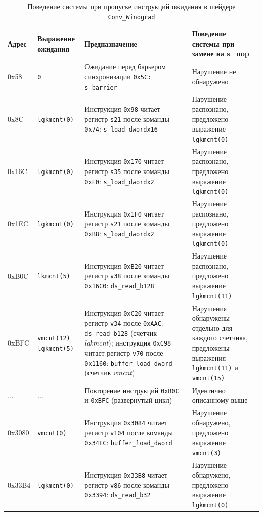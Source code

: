 \documentclass[a4paper,14pt]{extarticle}
\begin{document}
{\begin{table}[H]
  \caption{Поведение системы при пропуске инструкций ожидания в шейдере \texttt{Conv\_Winograd}}
\label{table:test-waitcnt-winograd}
\begin{tabular}{|l|p{2.8cm}|p{6.5cm}|p{5cm}|}
\hline
\textbf{Адрес} & \textbf{Выражение ожидания} & \textbf{Предназначение} & \textbf{Поведение системы при замене на s\_nop} \\\hline
0x58 & \verb|0|
  & Ожидание перед барьером синхронизации \texttt{0x5C: s\_barrier}
  & Нарушение не обнаружено \\\hline
0x8C & \verb|lgkmcnt(0)|
  & Инструкция \verb|0x98| читает регистр \verb|s21| после команды \verb|0x74|: \verb|s_load_dwordx16|
  & Нарушение распознано, предложено выражение \verb|lgkmcnt(0)| \\\hline
0x16C & \verb|lgkmcnt(0)|
  & Инструкция \verb|0x170| читает регистр \verb|s35| после команды \verb|0xE0|: \verb|s_load_dwordx2|
  & Нарушение распознано, предложено выражение \verb|lgkmcnt(0)| \\\hline
0x1EC & \verb|lgkmcnt(0)|
  & Инструкция \verb|0x1F0| читает регистр \verb|s21| после команды \verb|0xB8|: \verb|s_load_dwordx2|
  & Нарушение распознано, предложено выражение \verb|lgkmcnt(0)| \\\hline
0xB0C & \verb|lkmcnt(5)|
  & Инструкция \verb|0xB20| читает регистр \verb|v38| после команды \verb|0x16C0|: \verb|ds_read_b128|
  & Нарушение распознано, предложено выражение \verb|lgkmcnt(11)| \\\hline
0xBFC & \verb|vmcnt(12)| \verb|lgkmcnt(5)|
  & Инструкция \verb|0xC20| читает регистр \verb|v34| после \verb|0xAAC|: \verb|ds_read_b128| (счетчик \textit{lgkmcnt});
  инструкция \verb|0xC98| читает регистр \verb|v70| после \verb|0x1160|: \verb|buffer_load_dword| (счетчик \textit{vmcnt})
  & Нарушения обнаружены отдельно для каждого счетчика, предложены выражения \verb|lgkmcnt(11)| и \verb|vmcnt(15)| \\\hline 
... & ... & Повторение инструкций \texttt{0xB0C} и \texttt{0xBFC} (развернутый цикл) & Идентично описанному выше \\\hline
0x3080 & \verb|vmcnt(0)|
  & Инструкция \verb|0x3084| читает регистр \verb|v104| после команды \verb|0x34FC|: \verb|buffer_load_dword|
  & Нарушение обнаружено, предложено выражение \verb|vmcnt(3)| \\\hline
0x33B4 & \verb|lgkmcnt(0)|
  & Инструкция \verb|0x33B8| читает регистр \verb|v86| после команды \verb|0x3394|: \verb|ds_read_b32|
  & Нарушение обнаружено, предложено выражение \verb|lgkmcnt(0)| \\\hline
\end{tabular}
\end{table}

}
\end{document}
